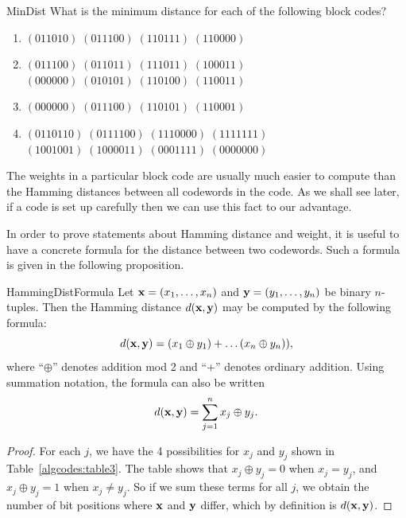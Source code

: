 \begin{exercise}{MinDist}
What is the minimum distance for each of the following 
block codes? 
\begin{enumerate}
 
 \bf\item\rm
$(011010) \; (011100) \; (110111) \; (110000)$
 
 \bf\item\rm
$(011100) \; (011011) \; (111011) \; (100011)$ \\
$(000000) \; (010101) \; (110100) \; (110011)$
 
 \bf\item\rm
$(000000) \; (011100) \; (110101) \; (110001)$
 
 \bf\item\rm
$(0110110) \; (0111100) \; (1110000) \; (1111111)$ \\
$(1001001) \; (1000011) \; (0001111) \; (0000000)$
 
\end{enumerate}
 \end{exercise}
 
The weights in a particular block code are usually much easier to compute
than the Hamming distances between all codewords in the code. As we shall see later, if a
code is set up carefully then we can use this fact to our advantage.
 
In order to prove statements about Hamming distance and weight, it is useful to have a concrete formula for the distance between two codewords.  Such a formula is given in the following proposition.

\begin{prop}{HammingDistFormula}
Let ${\bold x} = (x_1, \ldots, x_n)$ and  ${\bold y} = (y_1, \ldots, y_n)$ be binary $n$-tuples. Then the Hamming distance $d({\bold x},{\bold y})$ may be computed by the following formula:
\[d({\bold x},{\bold y}) = (x_1\oplus y_1) + \ldots (x_n\oplus y_n) ), \]
where ``$\oplus$'' denotes addition mod 2 and ``+'' denotes ordinary addition. Using summation notation, the formula can also be written
\[d({\bold x},{\bold y}) = \sum_{j=1}^n x_j\oplus y_j.\]
\end{prop}

\begin{proof}
For each $j$, we have the 4 possibilities for $x_j$ and $y_j$ shown in Table~\ref{algcodes:table3}. The table shows that $x_j\oplus y_j = 0$ when $x_j = y_j$, and $x_j\oplus y_j = 1$ when $x_j \neq y_j$. So if we sum these terms for all $j$, we obtain the number of bit positions where ${\bold x}$ and ${\bold y}$ differ, which by definition is $d({\bold x},{\bold y})$.
\end{proof}

